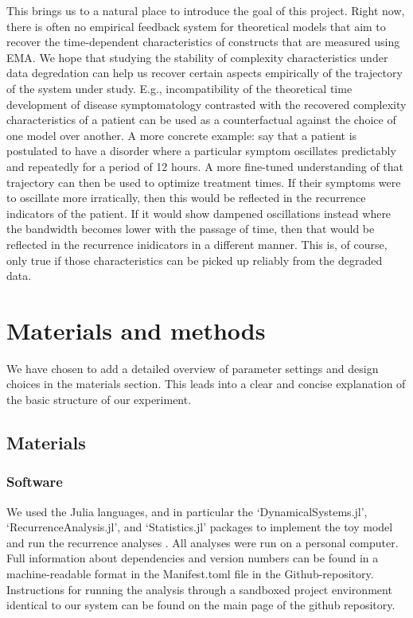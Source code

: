 \documentclass[utf8]{FrontiersinVancouver}
\begin{document}
This brings us to a natural place to introduce the goal of this project. Right now, there is often no empirical feedback system for theoretical models that aim to recover the time-dependent characteristics of constructs that are measured using EMA\@. We hope that studying the stability of complexity characteristics under data degredation can help us recover certain aspects empirically of the trajectory of the system under study. E.g., incompatibility of the theoretical time development of disease symptomatology contrasted with the recovered complexity characteristics of a patient can be used as a counterfactual against the choice of one model over another. A more concrete example: say that a patient is postulated to have a disorder where a particular symptom oscillates predictably and repeatedly for a period of 12 hours. A more fine-tuned understanding of that trajectory can then be used to optimize treatment times. If their symptoms were to oscillate more irratically, then this would be reflected in the recurrence indicators of the patient. If it would show dampened oscillations instead where the bandwidth becomes lower with the passage of time, then that would be reflected in the recurrence inidicators in a different manner. This is, of course, only true if those characteristics can be picked up reliably from the degraded data. 

\section{Materials and methods}

We have chosen to add a detailed overview of parameter settings and design choices in the materials section. This leads into a clear and concise explanation of the basic structure of our experiment. 

\subsection{Materials}

\subsubsection{Software}
We used the Julia languages, and in particular the `DynamicalSystems.jl', `RecurrenceAnalysis.jl', and `Statistics.jl' packages to implement the toy model and run the recurrence analyses \citep{bezanson2017julia, Datseris2018, DatserisParlitz2022}. All analyses were run on a personal computer. Full information about dependencies and version numbers can be found in a machine-readable format in the Manifest.toml file in the Github-repository. Instructions for running the analysis through a sandboxed project environment identical to our system can be found on the main page of the github repository.
\end{document}
